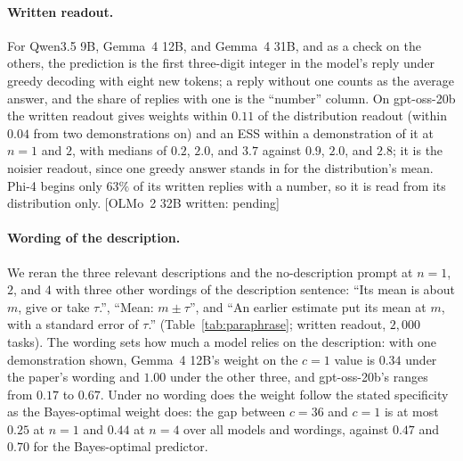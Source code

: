 \documentclass{article}
\begin{document}
\paragraph{Written readout.} For Qwen3.5 9B, Gemma~4 12B, and Gemma~4 31B, and as a check on the others, the prediction is the first three-digit integer in the model's reply under greedy decoding with eight new tokens; a reply without one counts as the average answer, and the share of replies with one is the ``number'' column. On gpt-oss-20b the written readout gives weights within $0.11$ of the distribution readout (within $0.04$ from two demonstrations on) and an ESS within a demonstration of it at $n = 1$ and $2$, with medians of $0.2$, $2.0$, and $3.7$ against $0.9$, $2.0$, and $2.8$; it is the noisier readout, since one greedy answer stands in for the distribution's mean. Phi-4 begins only $63\%$ of its written replies with a number, so it is read from its distribution only. [OLMo~2 32B written: pending]

\paragraph{Wording of the description.} We reran the three relevant descriptions and the no-description prompt at $n = 1$, $2$, and $4$ with three other wordings of the description sentence: ``Its mean is about $m$, give or take $\tau$.'', ``Mean: $m \pm \tau$'', and ``An earlier estimate put its mean at $m$, with a standard error of $\tau$.'' (Table~\ref{tab:paraphrase}; written readout, $2{,}000$ tasks). The wording sets how much a model relies on the description: with one demonstration shown, Gemma~4 12B's weight on the $c = 1$ value is $0.34$ under the paper's wording and $1.00$ under the other three, and gpt-oss-20b's ranges from $0.17$ to $0.67$. Under no wording does the weight follow the stated specificity as the Bayes-optimal weight does: the gap between $c = 36$ and $c = 1$ is at most $0.25$ at $n = 1$ and $0.44$ at $n = 4$ over all models and wordings, against $0.47$ and $0.70$ for the Bayes-optimal predictor.

\begin{table}[!htb]
\centering\footnotesize
\caption{\textbf{The wording of the description sets how much a model relies on it, but under no wording does the weight follow the stated specificity.} Weight on the stated value for the three relevant descriptions at $n = 1$ and $4$ under four wordings (written readout, $2{,}000$ tasks). Number: the share of replies with a number; italics: below three quarters in that cell. The Bayes-optimal weight is $0.50$, $0.80$, and $0.97$ at $n = 1$ and $0.20$, $0.50$, and $0.90$ at $n = 4$.}
\label{tab:paraphrase}
\vspace{3pt}

\end{table}
\end{document}
